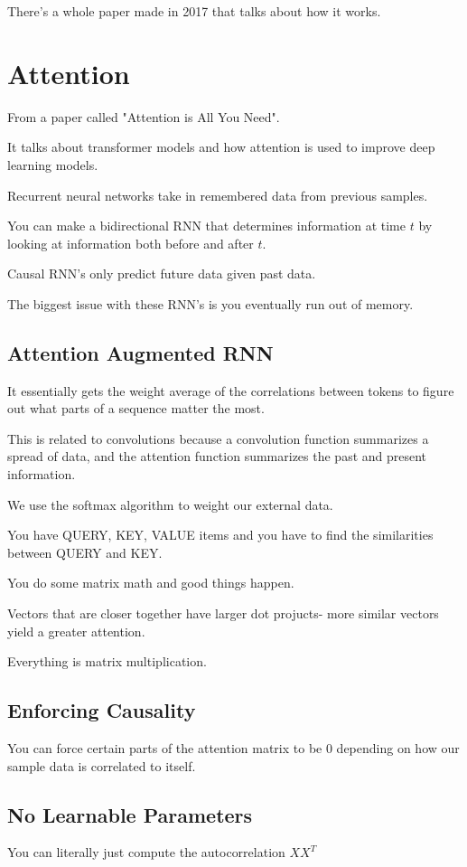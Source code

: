\documentclass[fleqn]{report}
\begin{document}
There's a whole paper made in 2017 that talks about how it works.

\section{Attention}
From a paper called "Attention is All You Need". 

It talks about transformer models and how attention is used to improve 
deep learning models. 

Recurrent neural networks take in remembered data from previous samples. 

You can make a bidirectional RNN that determines information at time $t$ by 
looking at information both before and after $t$. 

Causal RNN's only predict future data given past data. 

The biggest issue with these RNN's is you eventually run out of memory. 

\subsection{Attention Augmented RNN}
It essentially gets the weight average of the correlations between tokens 
to figure out what parts of a sequence matter the most. 

This is related to convolutions because a convolution function summarizes a spread 
of data, and the attention function summarizes the past and present information. 

We use the softmax algorithm to weight our external data. 

You have QUERY, KEY, VALUE items and you have to find the similarities between 
QUERY and KEY. 

You do some matrix math and good things happen. 

Vectors that are closer together have larger dot projucts- more similar 
vectors yield a greater attention. 

Everything is matrix multiplication. 

\subsection{Enforcing Causality}
You can force certain parts of the attention matrix to be 0 depending on 
how our sample data is correlated to itself.

\subsection{No Learnable Parameters}
You can literally just compute the autocorrelation $X X^T$ 
\end{document}

